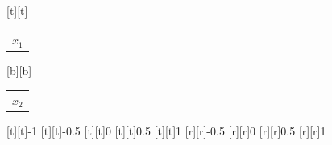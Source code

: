 %    
%
%
\begin{psfrags}%
\psfragscanon%
%
[t][t]{\color[rgb]{0,0,0}\setlength{\tabcolsep}{0pt}\begin{tabular}{c}$x_1$\end{tabular}}%
[b][b]{\color[rgb]{0,0,0}\setlength{\tabcolsep}{0pt}\begin{tabular}{c}$x_2$\end{tabular}}%
%
[t][t]{-1}%
[t][t]{-0.5}%
[t][t]{0}%
[t][t]{0.5}%
[t][t]{1}%
%
[r][r]{-0.5}%
[r][r]{0}%
[r][r]{0.5}%
[r][r]{1}%
%
%
\end{psfrags}%
%
